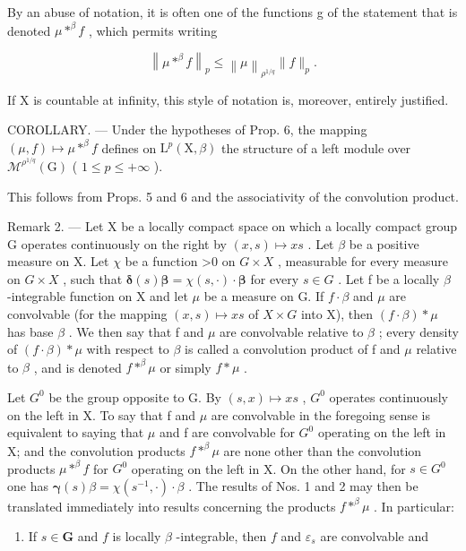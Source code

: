 By an abuse of notation, it is often one of the functions g of the statement that is denoted \(\mu * ^ {\beta} f\) , which permits writing

\[
\left\| \mu * ^ {\beta} f \right\| _ {p} \leqslant \left\| \mu \right\| _ {\rho^ {1 / q}} \| f \| _ {p}.
\]

If X is countable at infinity, this style of notation is, moreover, entirely justified.

COROLLARY. --- Under the hypotheses of Prop. 6, the mapping \((\mu, f) \mapsto \mu *^{\beta} f\) defines on \(\mathrm{L}^{p}(\mathrm{X}, \beta)\) the structure of a left module over \(\mathcal{M}^{\rho^{1/q}}(\mathrm{G})\) ( \(1 \leqslant p \leqslant +\infty\) ).

This follows from Props. 5 and 6 and the associativity of the convolution product.

Remark 2. --- Let X be a locally compact space on which a locally compact group G operates continuously on the right by \((x,s)\mapsto xs\) . Let \(\beta\) be a positive measure on X. Let \(\chi\) be a function \textgreater0 on \(G\times X\) , measurable for every measure on \(G\times X\) , such that \(\boldsymbol{\delta}(s)\boldsymbol{\beta}=\chi(s,\cdot)\cdot\boldsymbol{\beta}\) for every \(s\in G\) . Let f be a locally \(\beta\) -integrable function on X and let \(\mu\) be a measure on G. If \(f\cdot\beta\) and \(\mu\) are convolvable (for the mapping \((x,s)\mapsto xs\) of \(X\times G\) into X), then \((f\cdot\beta)*\mu\) has base \(\beta\) . We then say that f and \(\mu\) are convolvable relative to \(\beta\) ; every density of \((f\cdot\beta)*\mu\) with respect to \(\beta\) is called a convolution product of f and \(\mu\) relative to \(\beta\) , and is denoted \(f * ^ {\beta} \mu\) or simply \(f*\mu\) .

Let \(G^{0}\) be the group opposite to G. By \((s,x)\mapsto xs\) , \(G^{0}\) operates continuously on the left in X. To say that f and \(\mu\) are convolvable in the foregoing sense is equivalent to saying that \(\mu\) and f are convolvable for \(G^{0}\) operating on the left in X; and the convolution products \(f * ^ {\beta} \mu\) are none other than the convolution products \(\mu * ^ {\beta} f\) for \(G^{0}\) operating on the left in X. On the other hand, for \(s\in G^{0}\) one has \(\pmb{\gamma}(s)\beta = \chi(s^{-1},\cdot)\cdot \beta\) . The results of Nos. 1 and 2 may then be translated immediately into results concerning the products \(f * ^ {\beta} \mu\) . In particular:

\begin{enumerate}
\def\labelenumi{\arabic{enumi})}
\tightlist
\item
  If \(s \in \mathbf{G}\) and \(f\) is locally \(\beta\) -integrable, then \(f\) and \(\varepsilon_s\) are convolvable and
\end{enumerate}

